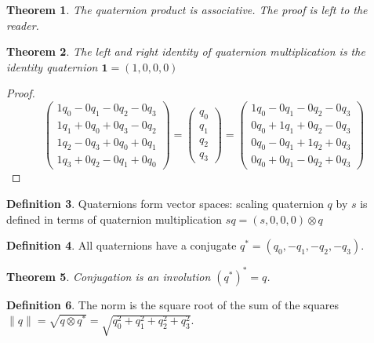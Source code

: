 \documentclass{amsart}
\newtheorem{theorem}{Theorem}[section]
\theoremstyle{definition}
\newtheorem{definition}[theorem]{Definition}
\theoremstyle{remark}
\numberwithin{equation}{section}
\begin{document}
\begin{theorem}
  The quaternion product is associative. The proof is left to the reader.
\end{theorem}

\begin{theorem}
  The left and right identity of quaternion multiplication is the \emph{identity quaternion} $\mathbf{1}=(1,0,0,0)$
\end{theorem}
\begin{proof}
  \begin{equation}
    \begin{pmatrix}
      1q_0 - 0q_1 - 0q_2 - 0q_3 \\
      1q_1 + 0q_0 + 0q_3 - 0q_2 \\
      1q_2 - 0q_3 + 0q_0 + 0q_1 \\
      1q_3 + 0q_2 - 0q_1 + 0q_0
    \end{pmatrix} =
    \begin{pmatrix}
      q_0 \\
      q_1 \\
      q_2 \\
      q_3
    \end{pmatrix} =  
    \begin{pmatrix}
      1q_0 - 0q_1 - 0q_2 - 0q_3 \\
      0q_0 + 1q_1 + 0q_2 - 0q_3 \\
      0q_0 - 0q_1 + 1q_2 + 0q_3 \\
      0q_0 + 0q_1 - 0q_2 + 0q_3
    \end{pmatrix}
  \end{equation}
\end{proof}

\begin{definition}
  Quaternions form vector spaces: scaling quaternion $q$ by $s$ is defined in terms of quaternion multiplication $sq = (s,0,0,0)\otimes q$
\end{definition}

\begin{definition}
  All quaternions have a conjugate $q^*=(q_0,-q_1,-q_2,-q_3)$. 
\end{definition}

\begin{theorem}
  Conjugation is an involution $(q^*)^*=q$.
\end{theorem}

\begin{definition}
  The norm is the square root of the sum of the squares $\|q\|=\sqrt{q\otimes q^*}=\sqrt{q_0^2+q_1^2+q_2^2+q_3^2}$.
\end{definition}
\end{document}
